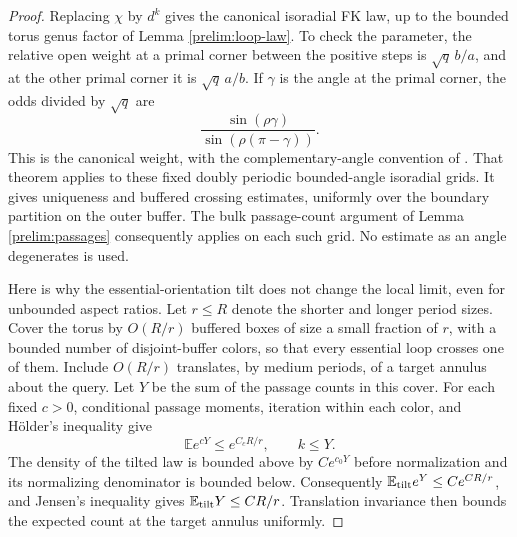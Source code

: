 \begin{proof}
Replacing $\chi$ by $d^k$ gives the canonical isoradial FK law,
up to the bounded torus genus factor of Lemma
\ref{prelim:loop-law}. To check the parameter, the relative
open weight at a primal corner between the positive steps is
$\sqrt q\,b/a$, and at the other primal corner it is
$\sqrt q\,a/b$. If $\gamma$ is the angle at the primal corner, the
odds divided by $\sqrt q$ are
\[
 \frac{\sin(\rho\gamma)}{\sin(\rho(\pi-\gamma))}.
\]
This is the canonical weight, with the complementary-angle
convention of \cite[Equation~(1.1), Theorem~1.1, and Equation~(1.3)]{DCLM2019Isoradial}. That theorem applies
to these fixed doubly periodic bounded-angle isoradial grids. It
gives uniqueness and buffered crossing estimates, uniformly over
the boundary partition on the outer buffer. The bulk passage-count
argument of Lemma \ref{prelim:passages} consequently applies
on each such grid. No estimate as an angle degenerates is used.

Here is why the essential-orientation tilt does not change the
local limit, even for unbounded aspect ratios. Let $r\le R$ denote
the shorter and longer period sizes. Cover the torus by $O(R/r)$
buffered boxes of size a small fraction of $r$, with a bounded
number of disjoint-buffer colors, so that every essential loop
crosses one of them. Include $O(R/r)$ translates, by medium periods,
of a target annulus about the query. Let $Y$ be the sum of the
passage counts in this cover. For each fixed $c>0$, conditional
passage moments, iteration within each color, and H\"older's
inequality give
\begin{equation}\label{bulk:torus-moment}
 \mathbb E e^{cY}\le e^{C_cR/r},\qquad k\le Y.
\end{equation}
The density of the tilted law is bounded above by $C e^{c_0Y}$
before normalization and its normalizing denominator is bounded
below. Consequently
$\mathbb E_{\rm tilt}e^Y\le C e^{CR/r}$, and Jensen's inequality
gives $\mathbb E_{\rm tilt}Y\le CR/r$. Translation invariance then
bounds the expected count at the target annulus uniformly.


\end{proof}
